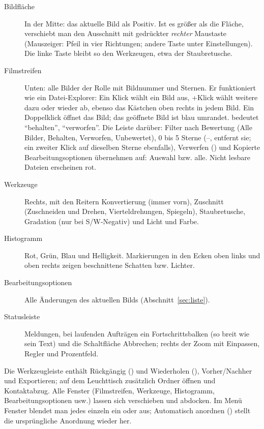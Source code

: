 \documentclass[a4paper,11pt,parskip=half,DIV=12]{scrartcl}
\newcommand{\menu}[1]{\textsf{#1}}                    %
\newcommand{\taste}[1]{\fbox{\footnotesize\textsf{#1}}} %
\newcommand{\ok}{\ding{51}}
\newcommand{\nein}{\ding{55}}
\begin{document}
\begin{description}
  \item[Bildfläche] In der Mitte: das aktuelle Bild als Positiv. Ist es größer als die
        Fläche, verschiebt man den Ausschnitt mit gedrückter \emph{rechter} Maustaste (Mauszeiger:
        Pfeil in vier Richtungen; andere Taste unter \menu{Einstellungen}). Die linke Taste bleibt
        so den Werkzeugen, etwa der Staubretusche.
  \item[Filmstreifen] Unten: alle Bilder der Rolle mit Bildnummer und Sternen. Er funktioniert
        wie ein Datei-Explorer: Ein Klick wählt ein Bild aus, \taste{Strg}+Klick wählt weitere
        dazu oder wieder ab, ebenso das Kästchen oben rechts in jedem Bild. Ein Doppelklick
        öffnet das Bild; das geöffnete Bild ist blau umrandet. \ok{} bedeutet
        \enquote{behalten}, \nein{} \enquote{verworfen}. Die Leiste darüber: Filter nach
        Bewertung (\menu{Alle Bilder}, \menu{Behalten}, \menu{Verworfen}, \menu{Unbewertet}),
        0 bis 5 Sterne (\taste{1}–\taste{5}, \taste{0} entfernt sie; ein zweiter Klick auf
        dieselben Sterne ebenfalls), \menu{Verwerfen} (\taste{X}) und \menu{Kopierte
        Bearbeitungsoptionen übernehmen auf:} \menu{Auswahl} bzw. \menu{alle}. Nicht lesbare
        Dateien erscheinen rot.
  \item[Werkzeuge] Rechts, mit den Reitern \menu{Konvertierung} (immer vorn),
        \menu{Zuschnitt} (Zuschneiden und Drehen, Vierteldrehungen, Spiegeln),
        \menu{Staubretusche}, \menu{Gradation} (nur bei S/W-Negativ) und \menu{Licht und
        Farbe}.
  \item[Histogramm] Rot, Grün, Blau und Helligkeit. Markierungen in den Ecken oben links und
        oben rechts zeigen beschnittene Schatten bzw. Lichter.
  \item[Bearbeitungsoptionen] Alle Änderungen des aktuellen Bilds (Abschnitt~\ref{sec:liste}).
  \item[Statusleiste] Meldungen, bei laufenden Aufträgen ein Fortschrittsbalken (so breit wie
        sein Text) und die Schaltfläche \menu{Abbrechen}; rechts der Zoom mit \menu{Einpassen},
        Regler und Prozentfeld.
\end{description}

Die Werkzeugleiste enthält Rückgängig (\textlarrow) und Wiederholen (\textrarrow),
Vorher/Nachher und Exportieren; auf dem Leuchttisch zusätzlich Ordner öffnen und
Kontaktabzug. Alle Fenster (Filmstreifen, Werkzeuge, Histogramm, Bearbeitungsoptionen usw.)
lassen sich verschieben und abdocken. Im Menü \menu{Fenster} blendet man jedes einzeln ein oder
aus; \menu{Automatisch anordnen} (\taste{Strg+Umschalt+A}) stellt die ursprüngliche Anordnung
wieder her.
\end{document}
